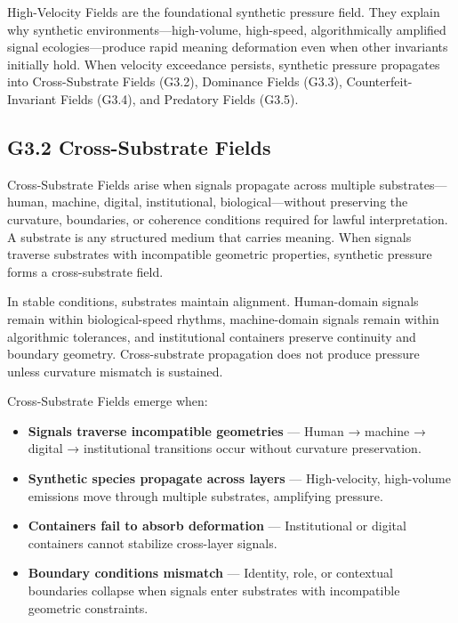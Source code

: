 \medskip

\noindent High-Velocity Fields are the foundational synthetic pressure field.
They explain why synthetic environments—high-volume, high-speed, algorithmically
amplified signal ecologies—produce rapid meaning deformation even when other
invariants initially hold. When velocity exceedance persists, synthetic pressure
propagates into Cross-Substrate Fields (G3.2), Dominance Fields (G3.3),
Counterfeit-Invariant Fields (G3.4), and Predatory Fields (G3.5).

\subsection*{G3.2 Cross-Substrate Fields}

\noindent Cross-Substrate Fields arise when signals propagate across multiple
substrates—human, machine, digital, institutional, biological—without preserving
the curvature, boundaries, or coherence conditions required for lawful
interpretation. A substrate is any structured medium that carries meaning. When
signals traverse substrates with incompatible geometric properties, synthetic
pressure forms a cross-substrate field.

\medskip

\noindent In stable conditions, substrates maintain alignment. Human-domain
signals remain within biological-speed rhythms, machine-domain signals remain
within algorithmic tolerances, and institutional containers preserve continuity
and boundary geometry. Cross-substrate propagation does not produce pressure
unless curvature mismatch is sustained.

\medskip

\noindent Cross-Substrate Fields emerge when:

\begin{itemize}[leftmargin=1.2cm]
    \item \textbf{Signals traverse incompatible geometries} — Human → machine →
    digital → institutional transitions occur without curvature preservation.

    \item \textbf{Synthetic species propagate across layers} — High-velocity,
    high-volume emissions move through multiple substrates, amplifying pressure.

    \item \textbf{Containers fail to absorb deformation} — Institutional or
    digital containers cannot stabilize cross-layer signals.

    \item \textbf{Boundary conditions mismatch} — Identity, role, or contextual
    boundaries collapse when signals enter substrates with incompatible
    geometric constraints.
\end{itemize}

